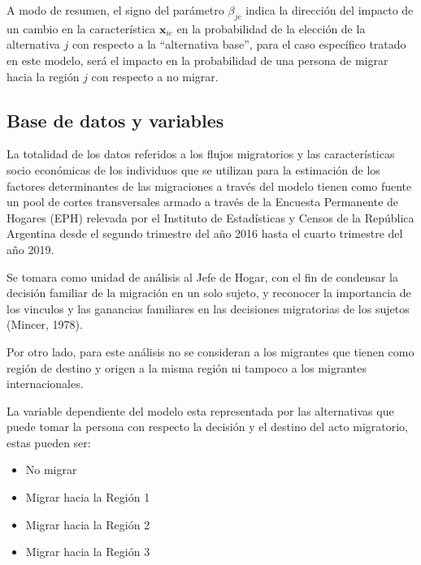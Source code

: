 \documentclass[12pt,a4paper]{article}
\begin{document}
A modo de resumen, el signo del parámetro $\beta_{jc}$ indica la dirección del impacto de un cambio en la característica $\textbf{x}_{ic}$ en la probabilidad de la elección de la alternativa $j$ con respecto a la ``alternativa base'', para el caso específico tratado en este modelo, será el impacto en la probabilidad de una persona de migrar hacia la región $j$ con respecto a no migrar.

\subsection{Base de datos y variables}
La totalidad de los datos referidos a los flujos migratorios y las características socio económicas de los individuos que se utilizan para la estimación de los factores determinantes de las migraciones a través del modelo tienen como fuente un pool de cortes transversales  armado a través de la Encuesta Permanente de Hogares (EPH) relevada por el Instituto de Estadísticas y Censos de la República Argentina desde el segundo trimestre del año 2016 hasta el cuarto trimestre del año 2019.

Se tomara como unidad de análisis al Jefe de Hogar, con el fin de condensar la decisión familiar de la migración en un solo sujeto, y reconocer la importancia de los vinculos y las ganancias familiares en las decisiones migratorias de los sujetos (Mincer, 1978).

Por otro lado, para este análisis no se consideran a los migrantes que tienen como región de destino y origen a la misma región ni tampoco a los migrantes internacionales.

La variable dependiente del modelo esta representada por las alternativas que puede tomar la persona con respecto la decisión y el destino del acto migratorio, estas pueden ser:
\begin{itemize}
\item No migrar
\item Migrar hacia la Región 1
\item Migrar hacia la Región 2
\item Migrar hacia la Región 3
\end{itemize}
\end{document}

